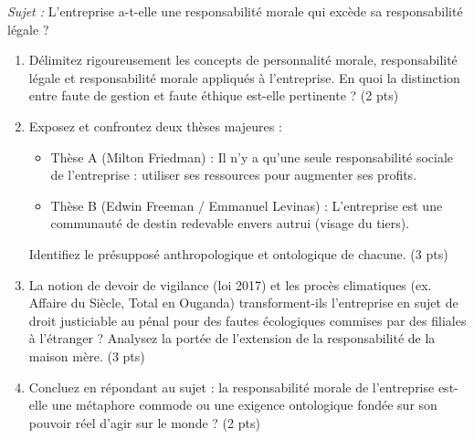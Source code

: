\documentclass[11pt]{article}
\begin{document}
\begin{exercice}
\textit{Sujet :} \og{}L'entreprise a-t-elle une responsabilité morale qui excède sa responsabilité légale ?\fg{}
\begin{enumerate}
    \item Délimitez rigoureusement les concepts de \og{}personnalité morale\fg{}, \og{}responsabilité légale\fg{} et \og{}responsabilité morale\fg{} appliqués à l'entreprise. En quoi la distinction entre \og{}faute de gestion\fg{} et \og{}faute éthique\fg{} est-elle pertinente ? (2 pts)
    \item Exposez et confrontez deux thèses majeures :
    \begin{itemize}
        \item Thèse A (Milton Friedman) : \og{}Il n'y a qu'une seule responsabilité sociale de l'entreprise : utiliser ses ressources pour augmenter ses profits\fg{}.
        \item Thèse B (Edwin Freeman / Emmanuel Levinas) : L'entreprise est une communauté de destin redevable envers autrui (visage du tiers).
    \end{itemize}
    Identifiez le présupposé anthropologique et ontologique de chacune. (3 pts)
    \item La notion de \og{}devoir de vigilance\fg{} (loi 2017) et les procès climatiques (ex. \og{}Affaire du Siècle\fg{}, Total en Ouganda) transforment-ils l'entreprise en \og{}sujet de droit\fg{} justiciable au pénal pour des fautes écologiques commises par des filiales à l'étranger ? Analysez la portée de l'extension de la responsabilité de la maison mère. (3 pts)
    \item Concluez en répondant au sujet : la responsabilité morale de l'entreprise est-elle une métaphore commode ou une exigence ontologique fondée sur son pouvoir réel d'agir sur le monde ? (2 pts)
\end{enumerate}
\end{exercice}
\end{document}
